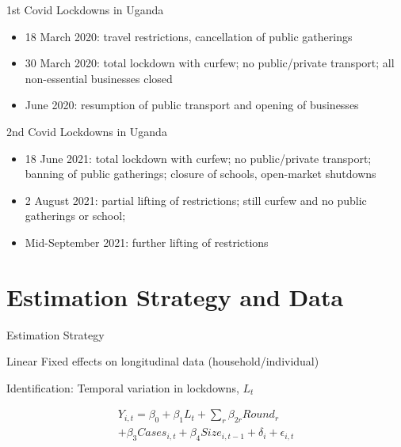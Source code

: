 \documentclass{beamer} %
\begin{document}
\begin{frame}{1st Covid Lockdowns in Uganda}


\begin{itemize}
\item 18 March 2020: travel restrictions, cancellation 
of public gatherings 
\item 30 March 2020: total lockdown with curfew; no public/private transport; 
all non-essential businesses closed
\item June 2020: resumption of public transport and opening of businesses
\end{itemize}

\end{frame}

\begin{frame}{2nd Covid Lockdowns in Uganda}

\begin{itemize}
\item 18 June 2021: total lockdown with curfew; no public/private transport;
banning of public gatherings; closure of schools, open-market shutdowns
\item 2 August 2021: partial lifting of restrictions; still curfew and 
no public gatherings or school; 
\item Mid-September 2021: further lifting of restrictions
\end{itemize}

\end{frame}



\section{Estimation Strategy and Data}

\begin{frame}{Estimation Strategy}

Linear Fixed effects on longitudinal data (household/individual)

\bigskip

Identification: Temporal variation in lockdowns, $L_t$

\begin{multline}
Y_{i,t} = \beta_0 + \beta_1 L_t + \sum_{r} \beta_{2r}  Round_r  \\
+ \beta_3 Cases_{i,t} + \beta_4 Size_{i,t-1}  + \delta_i + \epsilon_{i,t}
\end{multline}

\end{frame}
\end{document}
